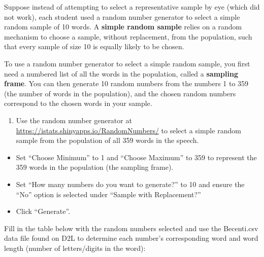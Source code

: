 \documentclass[
]{report}
\providecommand{\tightlist}{%
  \setlength{\itemsep}{0pt}\setlength{\parskip}{0pt}}
\begin{document}
Suppose instead of attempting to select a representative sample by eye (which did not work), each student used a random number generator to select a simple random sample of 10 words. A \textbf{simple random sample} relies on a random mechanism to choose a sample, without replacement, from the population, such that every sample of size 10 is equally likely to be chosen.

To use a random number generator to select a simple random sample, you first need a numbered list of all the words in the population, called a \textbf{sampling frame}. You can then generate 10 random numbers from the numbers 1 to 359 (the number of words in the population), and the chosen random numbers correspond to the chosen words in your sample.

\begin{enumerate}
\def\labelenumi{\arabic{enumi}.}
\setcounter{enumi}{9}
\tightlist
\item
  Use the random number generator at \url{https://istats.shinyapps.io/RandomNumbers/} to select a simple random sample from the population of all 359 words in the speech.
\end{enumerate}

\begin{itemize}
\item
  Set ``Choose Minimum'' to 1 and ``Choose Maximum'' to 359 to represent the 359 words in the population (the sampling frame).
\item
  Set ``How many numbers do you want to generate?'' to 10 and ensure the ``No'' option is selected under ``Sample with Replacement?''
\item
  Click ``Generate''.
\end{itemize}

Fill in the table below with the random numbers selected and use the Becenti.csv data file found on D2L to determine each number's corresponding word and word length (number of letters/digits in the word):
\end{document}
